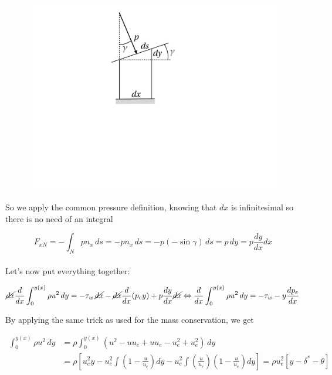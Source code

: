 \begin{figure}
\vspace{-7mm}
\includegraphics[scale=0.25]{ch5/17} 
\end{figure}

So we apply the common pressure definition, knowing that $dx$ is infinitesimal so there is no need of an integral 

\begin{equation}
F_{xN}=- \int_N p n_x \,d s =-p n_x \, d s =-p(-\sin \gamma)\, ds=p \, dy=p \frac{dy}{d x} dx
\end{equation}
\ \\

Let's now put everything together:

\begin{equation}
\cancel{dx} \frac{d}{dx} \int_{0}^{y(x)} \rho u^2 \, dy=-\tau_w \,\cancel{dx}-\cancel{dx} \frac{d}{dx}(p_ey)+p \frac{d y}{d x} \cancel{dx} \Leftrightarrow  \frac{d}{dx} \int_{0}^{y(x)} \rho u^2 \, dy=-\tau_w - y\frac{dp_e}{dx}
\end{equation}

By applying the same trick as used for the mass conservation, we get

\begin{equation}
\begin{aligned}
\int_{0}^{y(x)} \rho u^2 \, dy &= \rho \int_{0}^{y(x)}  (u^2-uu_e+uu_e-u_e^2+u_e^2) \, dy\\
&=\rho \left[u_e^2y-u_e^2 \int (1-\frac{u}{u_e})dy-u_e^2 \int (\frac{u}{u_e})(1-\frac{u}{u_e})dy\right] = \rho u_e^2[y-\delta^*-\theta]
\end{aligned}
\end{equation}

